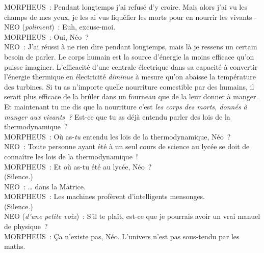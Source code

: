 \begin{playdialog}
MORPHEUS~: Pendant longtemps j'ai refusé d'y croire. Mais alors j'ai vu les champs de mes yeux, je les ai vus liquéfier les morts pour en nourrir les vivants -\\

NEO (\emph{poliment})~: Euh, excuse-moi.\\

MORPHEUS~: Oui, Néo~?\\

NEO~: J'ai réussi à ne rien dire pendant longtemps, mais là je ressens un certain besoin de parler. Le corps humain est la source d'énergie la moins efficace qu'on puisse imaginer. L'efficacité d'une centrale électrique dans sa capacité à convertir l'énergie thermique en électricité \emph{diminue} à mesure qu'on abaisse la température des turbines. Si tu as n'importe quelle nourriture comestible par des humains, il serait plus efficace de la brûler dans un fourneau que de la leur donner à manger. Et maintenant tu me dis que la nourriture c'est \emph{les corps des morts, donnés à manger aux vivants~?} Est-ce que tu as déjà entendu parler des lois de la thermodynamique~?\\

MORPHEUS~: Où as-\emph{tu} entendu les lois de la thermodynamique, Néo~?\\

NEO~: Toute personne ayant été à un seul cours de science au lycée se doit de connaître les lois de la thermodynamique~!\\

MORPHEUS~: Et où as-tu été au lycée, Néo~?\\

(Silence.)\\

NEO~: … dans la Matrice.\\

MORPHEUS~: Les machines profèrent d'intelligents mensonges.\\

(Silence.)\\

NEO (\emph{d'une petite voix})~: S'il te plaît, est-ce que je pourrais avoir un vrai manuel de physique~?\\

MORPHEUS~: Ça n'existe pas, Néo. L'univers n'est pas sous-tendu par les maths.\\ \end{playdialog}

